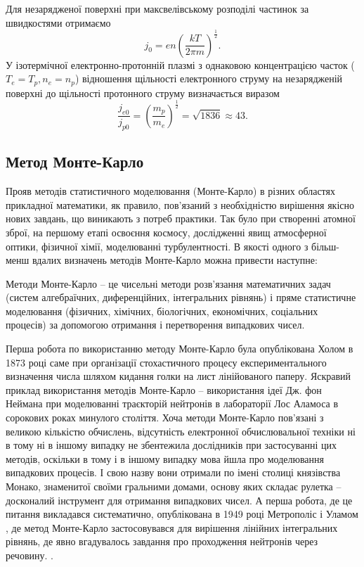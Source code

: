 \documentclass[a4paper,12pt]{article}
\begin{document}
Для незарядженої поверхні при максвелівському розподілі частинок за швидкостями отримаємо
\begin{equation} \label{eq:density}
j_0 = e n \left( \frac{kT}{2 \pi m} \right)^\frac{1}{2}.
\end{equation}
У ізотермічної електронно-протонній плазмі з однаковою концентрацією часток ($T_e = T_p, n_e = n_p$) відношення щільності електронного струму на незарядженій поверхні до щільності протонного струму визначається виразом \cite{novikov}
\[
\frac{j_{e0}}{j_{p0}} = \left( \frac{m_p}{m_e} \right)^\frac{1}{2} = \sqrt{1836} \approx 43.
\]

\subsection{Метод Монте-Карло}
Прояв методів статистичного моделювання (Монте-Карло) в різних областях прикладної математики, як правило, пов'язаний з необхідністю вирішення якісно нових завдань, що виникають з потреб практики. Так було при створенні атомної зброї, на першому етапі освоєння космосу, дослідженні явищ атмосферної оптики, фізичної хімії, моделюванні турбулентності. В якості одного з більш-менш вдалих визначень методів Монте-Карло можна привести наступне:

Методи Монте-Карло -- це чисельні методи розв'язання математичних задач (систем алгебраїчних, диференційних, інтегральних рівнянь) і пряме статистичне моделювання (фізичних, хімічних, біологічних, економічних, соціальних процесів) за допомогою отримання і перетворення випадкових чисел.
 
Перша робота по використанню методу Монте-Карло була опублікована Холом в 1873 році саме при організації стохастичного процесу експериментального визначення числа шляхом кидання голки на лист лінійованого паперу. Яскравий приклад використання методів Монте-Карло -- використання ідеї Дж. фон Неймана при моделюванні траєкторій нейтронів в лабораторії Лос Аламоса в сорокових роках минулого століття. Хоча методи Монте-Карло пов'язані з великою кількістю обчислень, відсутність електронної обчислювальної техніки ні в тому ні в іншому випадку не збентежила дослідників при застосуванні цих методів, оскільки в тому і в іншому випадку мова йшла про моделювання випадкових процесів. І свою назву вони отримали по імені столиці князівства Монако, знаменитої своїми гральними домами, основу яких складає рулетка -- досконалий інструмент для отримання випадкових чисел. А перша робота, де це питання викладався систематично, опублікована в 1949 році Метрополіс і Уламом \cite{Metropolis}, де метод Монте-Карло застосовувався для вирішення лінійних інтегральних рівнянь, де явно вгадувалось завдання про проходження нейтронів через речовину. \cite{belocerkovskyi}.
\end{document}
